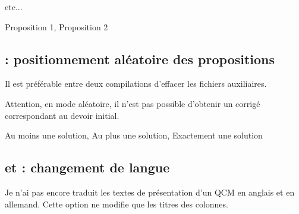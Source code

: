\begin{minipage}[c][][t]{.45\linewidth}
\begin{tkzexample}
  \begin{alterqcm}%
  [lq=3cm,
   numprop   = true,
   propstyle = \Roman]
  etc...
  \end{alterqcm}\end{tkzexample}
\end{minipage}\hfill
\begin{minipage}[c][][t]{.45\linewidth}
  \begin{alterqcm}%
  [lq=3cm,
   numprop   = true,
   propstyle = \Roman]
  {%
  {Proposition 1},
  {Proposition 2}%
  }
  \end{alterqcm}
\end{minipage}

\subsection{ : positionnement aléatoire des propositions }

Il est préférable entre deux compilations d'effacer les fichiers auxiliaires.

\textcolor{red}{\lefthand} Attention, en mode aléatoire, il n'est pas possible d'obtenir un corrigé correspondant au devoir initial.

\begin{tkzexample}[small]
 \begin{alterqcm}[lq=55mm,alea]
 {{Au moins une solution},%
 {Au plus une solution},%
 {Exactement une solution}}
 \end{alterqcm}\end{tkzexample}

\subsection{ et  : changement de langue }

Je n'ai pas encore traduit les textes de présentation d'un QCM en anglais et en allemand. Cette option ne modifie que les titres des colonnes.

   
